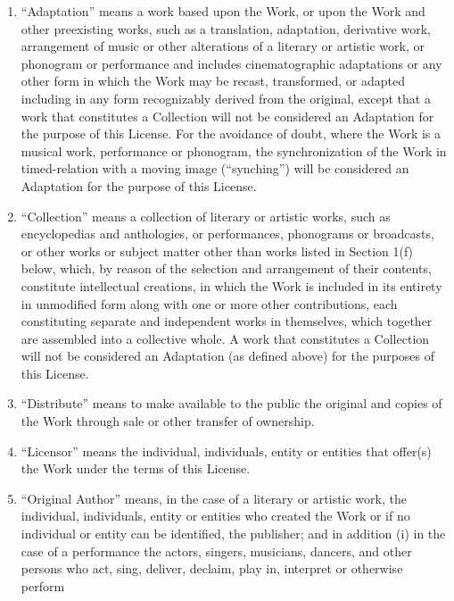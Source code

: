 \begin{enumerate}
 \item  ``Adaptation'' means a work based upon the Work, or upon the
        Work and other preexisting works, such as a translation,
        adaptation, derivative work, arrangement of music or other
        alterations of a literary or artistic work, or phonogram or
        performance and includes cinematographic adaptations or any
        other form in which the Work may be recast, transformed, or
        adapted including in any form recognizably derived from the
        original, except that a work that constitutes a Collection will
        not be considered an Adaptation for the purpose of this
        License. For the avoidance of doubt, where the Work is a musical
        work, performance or phonogram, the synchronization of the Work
        in timed-relation with a moving image (``synching'') will be
        considered an Adaptation for the purpose of this License.
 \item ``Collection'' means a collection of literary or artistic works,
       such as encyclopedias and anthologies, or performances,
       phonograms or broadcasts, or other works or subject matter other
       than works listed in Section 1(f) below, which, by reason of the
       selection and arrangement of their contents, constitute
       intellectual creations, in which the Work is included in its
       entirety in unmodified form along with one or more other
       contributions, each constituting separate and independent works
       in themselves, which together are assembled into a collective
       whole. A work that constitutes a Collection will not be
       considered an Adaptation (as defined above) for the purposes of
       this License.
 \item ``Distribute'' means to make available to the public the original
       and copies of the Work through sale or other transfer of
       ownership.
 \item ``Licensor'' means the individual, individuals, entity or
       entities that offer(s) the Work under the terms of this License.
 \item ``Original Author'' means, in the case of a literary or artistic
       work, the individual, individuals, entity or entities who created
       the Work or if no individual or entity can be identified, the
       publisher; and in addition (i) in the case of a performance the
       actors, singers, musicians, dancers, and other persons who act,
       sing, deliver, declaim, play in, interpret or otherwise perform

\end{enumerate}
